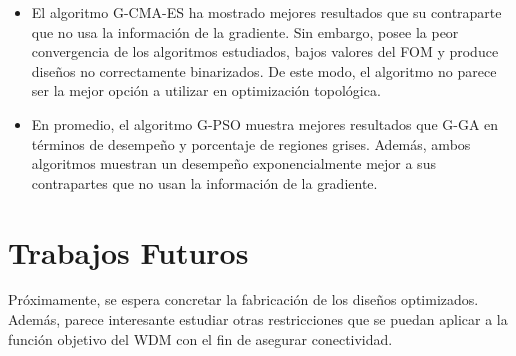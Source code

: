 \begin{itemize}
  \item El algoritmo G-CMA-ES ha mostrado mejores resultados que su contraparte que no usa
        la información de la gradiente. Sin embargo, posee la peor convergencia de los
        algoritmos estudiados, bajos valores del FOM y 
        produce diseños no correctamente binarizados.
        De este modo, el algoritmo no parece ser la mejor opción a utilizar en optimización
        topológica. 
        
  \item En promedio, el algoritmo G-PSO muestra mejores resultados que G-GA en
        términos de desempeño y porcentaje de regiones grises.
        Además, ambos algoritmos muestran un desempeño exponencialmente mejor
        a sus contrapartes que no usan la información de la gradiente.

\end{itemize}

\section{Trabajos Futuros}

Próximamente, se espera concretar la fabricación de los diseños optimizados.
Además, parece interesante estudiar otras restricciones que se puedan aplicar a la función
objetivo del WDM con el fin de asegurar conectividad.
